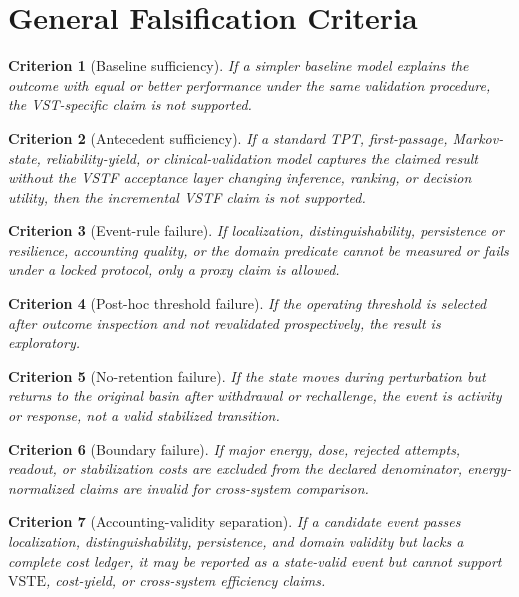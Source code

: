 \documentclass[11pt,a4paper]{article}
\newtheorem{criterion}{Criterion}
\newcommand{\VSTE}{\ensuremath{\mathrm{VSTE}}}
\newcommand{\1}{\mathbf{1}}
\begin{document}
\section{General Falsification Criteria}

\begin{criterion}[Baseline sufficiency]
If a simpler baseline model explains the outcome with equal or better performance under the same validation procedure, the VST-specific claim is not supported.
\end{criterion}

\begin{criterion}[Antecedent sufficiency]
If a standard TPT, first-passage, Markov-state, reliability-yield, or clinical-validation model captures the claimed result without the VSTF acceptance layer changing inference, ranking, or decision utility, then the incremental VSTF claim is not supported.
\end{criterion}

\begin{criterion}[Event-rule failure]
If localization, distinguishability, persistence or resilience, accounting quality, or the domain predicate cannot be measured or fails under a locked protocol, only a proxy claim is allowed.
\end{criterion}

\begin{criterion}[Post-hoc threshold failure]
If the operating threshold is selected after outcome inspection and not revalidated prospectively, the result is exploratory.
\end{criterion}

\begin{criterion}[No-retention failure]
If the state moves during perturbation but returns to the original basin after withdrawal or rechallenge, the event is activity or response, not a valid stabilized transition.
\end{criterion}

\begin{criterion}[Boundary failure]
If major energy, dose, rejected attempts, readout, or stabilization costs are excluded from the declared denominator, energy-normalized claims are invalid for cross-system comparison.
\end{criterion}

\begin{criterion}[Accounting-validity separation]
If a candidate event passes localization, distinguishability, persistence, and domain validity but lacks a complete cost ledger, it may be reported as a state-valid event but cannot support \VSTE{}, cost-yield, or cross-system efficiency claims.
\end{criterion}
\end{document}
